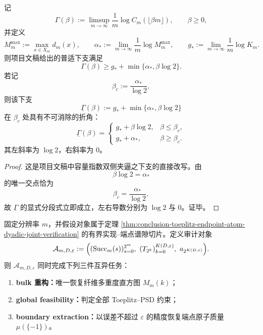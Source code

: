 \begin{proposition}[可逆容量指数的普适折角]\label{prop:conclusion-capacity-exponent-universal-fold-angle}
记
\[
\Gamma(\beta):=
\limsup_{m\to\infty}\frac1m\log C_m(\lfloor \beta m\rfloor),
\qquad
\beta\ge 0,
\]
并定义
\[
M_m^{\max}:=\max_{x\in X_m}d_m(x),
\qquad
\alpha_\ast:=\lim_{m\to\infty}\frac1m\log M_m^{\max},
\qquad
g_\ast:=\lim_{m\to\infty}\frac1m\log K_m.
\]
则项目文稿给出的普适下支满足
\[
\Gamma(\beta)\ge g_\ast+\min\{\alpha_\ast,\beta\log 2\}.
\]
若记
\[
\beta_c:=\frac{\alpha_\ast}{\log 2},
\]
则该下支
\[
\underline\Gamma(\beta):=g_\ast+\min\{\alpha_\ast,\beta\log 2\}
\]
在 \(\beta_c\) 处具有不可消除的折角：
\[
\underline\Gamma(\beta)=
\begin{cases}
g_\ast+\beta\log 2,& \beta\le \beta_c,\\[1mm]
g_\ast+\alpha_\ast,& \beta\ge \beta_c.
\end{cases}
\]
其左斜率为 \(\log 2\)，右斜率为 \(0\)。
\end{proposition}

\begin{proof}
这是项目文稿中容量指数双侧夹逼之下支的直接改写。由
\[
\beta\log 2=\alpha_\ast
\]
的唯一交点恰为
\[
\beta_c=\frac{\alpha_\ast}{\log 2},
\]
故 \(\underline\Gamma\) 的显式分段式立即成立，左右导数分别为 \(\log 2\) 与 \(0\)。证毕。
\end{proof}

\begin{theorem}\label{thm:conclusion-bulk-boundary-joint-finite-complete-audit}
固定分辨率 \(m\)，并假设对象属于定理 \ref{thm:conclusion-toeplitz-endpoint-atom-dyadic-joint-verification} 的有界实现--端点谱隙切片。定义审计对象
\[
\mathcal A_{m,D,\varepsilon}
:=
\Bigl(
(\mathrm{Succ}_m(s))_{s=0}^{2^m},
\ (T_{2^k})_{k=0}^{K(D,\varepsilon)},
\ a_{2^{K(D,\varepsilon)}}
\Bigr).
\]
则 \(\mathcal A_{m,D,\varepsilon}\) 同时完成下列三件互异任务：
\begin{enumerate}
  \item \textbf{bulk 重构：}唯一恢复纤维多重度直方图 \(M_m(k)\)；
  \item \textbf{global feasibility：}判定全部 Toeplitz--PSD 约束；
  \item \textbf{boundary extraction：}以误差不超过 \(\varepsilon\) 的精度恢复端点原子质量 \(\mu(\{-1\})\)。
\end{enumerate}
\end{theorem}


